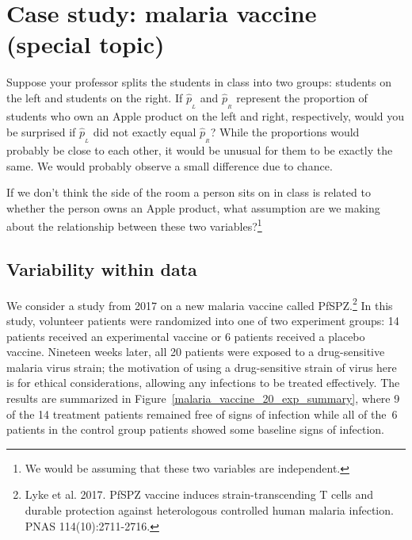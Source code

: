 

\section[Case study: malaria vaccine (special topic)]
  {Case study: malaria vaccine\\(special topic)}%

\begin{example}{Suppose your professor splits the students in class into two groups: students on the left and students on the right. If $\hat{p}_{_L}$ and $\hat{p}_{_R}$ represent the proportion of students who own an Apple product on the left and right, respectively, would you be surprised if $\hat{p}_{_L}$ did not {exactly} equal $\hat{p}_{_R}$?}\label{classRightLeftSideApple}
While the proportions would probably be close to each other, it would be unusual for them to be exactly the same. We would probably observe a small difference due to {chance}.
\end{example}

\begin{exercise}
If we don't think the side of the room a person sits on in class is related to whether the person owns an Apple product, what assumption are we making about the relationship between these two variables?\footnote{We would be assuming that these two variables are independent.}
\end{exercise}

\subsection{Variability within data}
\label{variabilityWithinData}


We consider a study from 2017 on a new malaria vaccine
called PfSPZ.\footnote{Lyke et al. 2017.
  PfSPZ vaccine induces strain-transcending T cells
  and durable protection against heterologous controlled
  human malaria infection.
  PNAS 114(10):2711-2716.}
In this study, volunteer patients were randomized
into one of two experiment groups:
14 patients received an experimental vaccine
or 6 patients received a placebo vaccine.
Nineteen weeks later, all 20 patients were exposed
to a drug-sensitive malaria virus strain;
the motivation of using a drug-sensitive strain
of virus here is for ethical considerations,
allowing any infections to be treated effectively.
The results are summarized in
Figure~\ref{malaria_vaccine_20_exp_summary},
where 9 of the 14 treatment patients remained free
of signs of infection while all of the~6 patients
in the control group patients showed some baseline
signs of infection.


